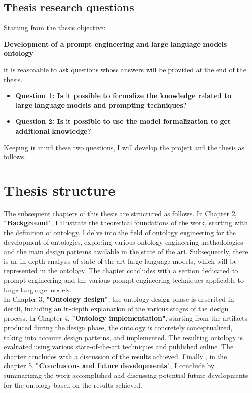 \subsection{Thesis research questions}
Starting from the thesis objective:\\
\begin{center}
\textbf{\large Development of a prompt engineering and large language models ontology}
\end{center}

it is reasonable to ask questions whose answers will be provided at the end of the thesis.

\begin{itemize}
    \item \textbf{\large Question 1: 
Is it possible to formalize the knowledge related to large language models and prompting techniques?}

\item \textbf{\large Question 2: Is it possible to use the model formalization to get additional knowledge?}
\end{itemize}

Keeping in mind these two questions, I will develop the project and the thesis as follows.



\section{Thesis structure}
The subsequent chapters of this thesis are structured as follows. In Chapter 2, \textbf{"Background"}, I illustrate the theoretical foundations of the work, starting with the definition of ontology. I delve into the field of ontology engineering for the development of ontologies, exploring various ontology engineering methodologies and the main design patterns available in the state of the art. Subsequently, there is an in-depth analysis of state-of-the-art large language models, which will be represented in the ontology. The chapter concludes with a section dedicated to prompt engineering and the various prompt engineering techniques applicable to large language models.\\
In Chapter 3, \textbf{"Ontology design"}, the ontology design phase is described in detail, including an in-depth explanation of the various stages of the design process. In Chapter 4, \textbf{"Ontology implementation"}, starting from the artifacts produced during the design phase, the ontology is concretely conceptualized, taking into account design patterns, and implemented. The resulting ontology is evaluated using various state-of-the-art techniques and published online. The chapter concludes with a discussion of the results achieved. Finally , in the chapter 5, \textbf{"Conclusions and future developments"}, I conclude by summarizing the work accomplished and discussing potential future developments for the ontology based on the results achieved.
